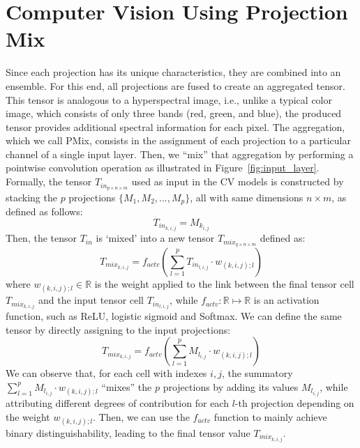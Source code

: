 


\section{Computer Vision Using Projection Mix}

Since each projection has its unique characteristics, they are combined into an ensemble. For this end, all projections are fused to create an aggregated tensor. This tensor is analogous to a hyperspectral image, i.e., unlike a typical color image, which consists of only three bands (red, green, and blue), the produced tensor provides additional spectral information for each pixel. The aggregation, which we call \gls{PMix}, consists in the assignment of each projection to a particular channel of a single input layer. Then, we ``mix'' that aggregation by performing a pointwise convolution operation as illustrated in Figure~\ref{fig:input_layer}. Formally, the tensor $T_{in_{p \times n \times m}}$ used as input in the \gls{CV} models is constructed by stacking the $p$ projections $\{M_1, M_2, ..., M_p\}$, all with same dimensions $n \times m$, as defined as follows:
\begin{equation}
    T_{in_{k,i,j}} = M_{k_{i,j}}
\end{equation}
\noindent Then, the tensor $T_{in}$ is `mixed' into a new tensor $T_{mix_{q \times n \times m}}$ defined as:
\begin{equation}
    T_{mix_{k,i,j}} = f_{actv}\left(\sum\limits_{l=1}^{p}T_{in_{l,i,j}} \cdot w_{(k,i,j);l}\right)
\end{equation} 
\noindent where $w_{(k,i,j);l} \in \mathbb{R}$ is the weight applied to the link between the final tensor cell $T_{mix_{k,i,j}}$ and the input tensor cell $T_{in_{l,i,j}}$, while $f_{actv}: \mathbb{R} \mapsto \mathbb{R}$ is an activation function, such as ReLU, logistic sigmoid and Softmax. We can define the same tensor by directly assigning to the input projections:
\begin{equation}
    \label{eq:mix}
    T_{mix_{k,i,j}} = f_{actv}\left(\sum\limits_{l=1}^{p}M_{l_{i,j}} \cdot w_{(k,i,j);l}\right)
\end{equation}
\noindent We can observe that, for each cell with indexes $i,j$, the summatory $\sum\limits_{l=1}^{p}M_{l_{i,j}} \cdot w_{(k,i,j);l}$ ``mixes'' the $p$ projections by adding its values $M_{l_{i,j}}$, while attributing different degrees of contribution for each $l$-th projection depending on the weight $w_{(k,i,j);l}$. Then, we can use the $f_{actv}$ function to mainly achieve binary distinguishability, leading to the final tensor value $T_{mix_{k,i,j}}$. 


